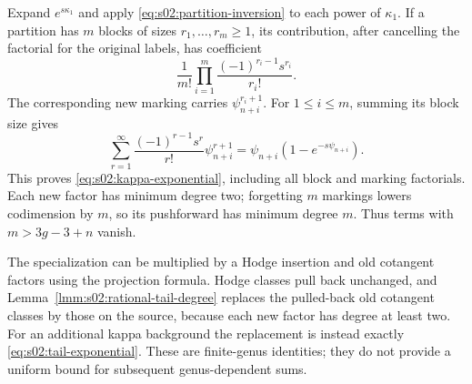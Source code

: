 \begin{prf}
Expand $e^{s\kappa_1}$ and apply
\eqref{eq:s02:partition-inversion} to each power of $\kappa_1$.
If a partition has $m$ blocks of sizes $r_1,\ldots,r_m\geq1$, its
contribution, after cancelling the factorial for the original labels,
has coefficient
\[
\frac{1}{m!}\prod_{i=1}^m
\frac{(-1)^{r_i-1}s^{r_i}}{r_i!}.
\]
The corresponding new marking carries $\psi_{n+i}^{r_i+1}$.
For $1\leq i\leq m$, summing its block size gives
\[
\sum_{r=1}^{\infty}\frac{(-1)^{r-1}s^r}{r!}\psi_{n+i}^{r+1}
=\psi_{n+i}(1-e^{-s\psi_{n+i}}).
\]
This proves \eqref{eq:s02:kappa-exponential}, including all block
and marking factorials.  Each new factor has minimum degree two;
forgetting $m$ markings lowers codimension by $m$, so its pushforward
has minimum degree $m$.  Thus terms with $m>3g-3+n$ vanish.
\end{prf}

The specialization can be multiplied by a Hodge insertion and old
cotangent factors using the projection formula.  Hodge classes pull
back unchanged, and Lemma~\ref{lmm:s02:rational-tail-degree} replaces
the pulled-back old cotangent classes by those on the source, because
each new factor has degree at least two.  For an additional kappa
background the replacement is instead exactly
\eqref{eq:s02:tail-exponential}.  These are finite-genus identities;
they do not provide a uniform bound for subsequent genus-dependent
sums.
